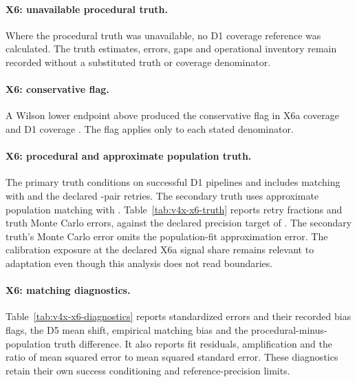 \paragraph{X6: unavailable procedural truth.}
Where the procedural truth was unavailable, no D1 coverage reference was calculated.
The truth estimates, errors, gaps and operational inventory remain recorded without a substituted truth or coverage denominator.

\paragraph{X6: conservative flag.}
A Wilson lower endpoint above  produced the conservative flag in  X6a coverage  and  D1 coverage .
The flag applies only to each stated denominator.

\paragraph{X6: procedural and approximate population truth.}
The primary truth conditions on successful D1 pipelines and includes matching with   and the declared -pair retries.
The secondary truth uses approximate population matching with  .
Table~\ref{tab:v4x-x6-truth} reports retry fractions and truth Monte Carlo errors, against the declared precision target of .
The secondary truth's Monte Carlo error omits the population-fit approximation error.
The calibration exposure at the declared X6a signal share remains relevant to adaptation even though this analysis does not read boundaries.

\paragraph{X6: matching diagnostics.}
Table~\ref{tab:v4x-x6-diagnostics} reports standardized errors and their recorded bias flags, the D5 mean shift, empirical matching bias and the procedural-minus-population truth difference. It also reports fit residuals, amplification and the ratio of mean squared error to mean squared standard error.
These diagnostics retain their own success conditioning and reference-precision limits.

